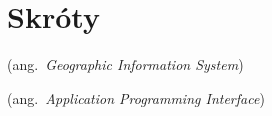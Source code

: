 \chapter*{Skróty}\mbox{}
\label{sec:skroty}
\noindent
\begin{description}[labelwidth=*]
  \item [GIS] (ang.\ \emph{Geographic Information System})
  \item [API] (ang.\ \emph{Application Programming Interface})
\end{description}
